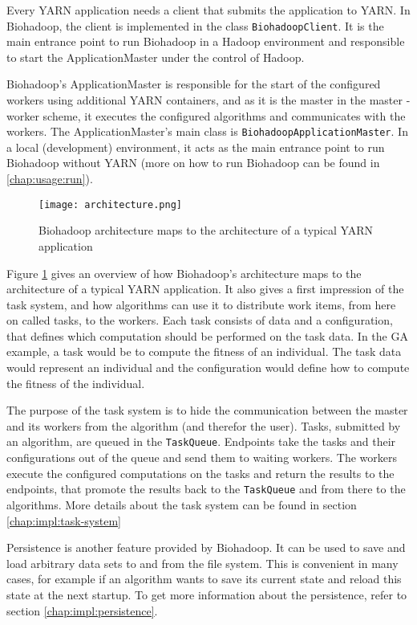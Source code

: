   Every YARN application needs a client that submits the application to YARN. In Biohadoop, the client is implemented in the class \texttt{BiohadoopClient}. It is the main entrance point to run Biohadoop in a Hadoop environment and responsible to start the ApplicationMaster under the control of Hadoop.
  
  Biohadoop's ApplicationMaster is responsible for the start of the configured workers using additional YARN containers, and as it is the master in the master - worker scheme, it executes the configured algorithms and communicates with the workers. The ApplicationMaster's main class is \texttt{BiohadoopApplicationMaster}. In a local (development) environment, it acts as the main entrance point to run Biohadoop without YARN (more on how to run Biohadoop can be found in \ref{chap:usage:run}).
  
  \begin{figure}[ht!]
    \centering
    \texttt{[image: architecture.png]}
    \caption{Biohadoop architecture maps to the architecture of a typical YARN application}
    \label{fig:architecture}
  \end{figure}
  
  Figure \ref{fig:architecture} gives an overview of how Biohadoop's architecture maps to the architecture of a typical YARN application. It also gives a first impression of the task system, and how algorithms can use it to distribute work items,  from here on called tasks, to the workers. Each task consists of data and a configuration, that defines which computation should be performed on the task data. In the GA example, a task would be to compute the fitness of an individual. The task data would represent an individual and the configuration would define how to compute the fitness of the individual.
  
  The purpose of the task system is to hide the communication between the master and its workers from the algorithm (and therefor the user). Tasks, submitted by an algorithm, are queued in the \texttt{TaskQueue}. Endpoints take the tasks and their configurations out of the queue and send them to waiting workers. The workers execute the configured computations on the tasks and return the results to the endpoints, that promote the results back to the \texttt{TaskQueue} and from there to the algorithms. More details about the task system can be found in section \ref{chap:impl:task-system}
  
  Persistence is another feature provided by Biohadoop. It can be used to save and load arbitrary data sets to and from the file system. This is convenient in many cases, for example if an algorithm wants to save its current state and reload this state at the next startup. To get more information about the persistence, refer to section \ref{chap:impl:persistence}.
  
